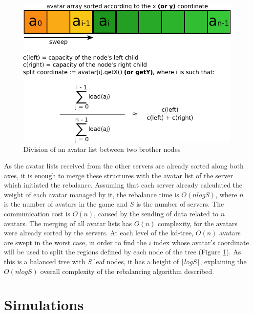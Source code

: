 \documentclass[acmjacm]{acmtrans2m}
\newcommand{\figurecaption}{Figure}
\begin{document}
\begin{figure}
  \centering
  \includegraphics[width=0.8\linewidth]{images/balancenode}
  \caption{Division of an avatar list between two brother nodes}
   \label{fig:balancenode}
\end{figure}

As the avatar lists received from the other servers are already sorted along both axes, it is enough to merge these structures with the avatar list of the server which initiated the rebalance. Assuming that each server already calculated the weight of each avatar managed by it, the rebalance time is  $O(nlogS)$, where $n$ is the number of avatars in the game and $S$ is the number of servers. The communication cost is $O(n)$, caused by the sending of data related to $n$ avatars. The merging of all avatar lists has $O(n)$ complexity, for the avatars were already sorted by the servers. At each level of the kd-tree, $O(n)$ avatars are swept in the worst case, in order to find the $i$ index whose avatar's coordinate will be used to split the regions defined by each node of the tree (\figurecaption{} \ref{fig:balancenode}). As this is a balanced tree with $S$ leaf nodes, it has a height of $\lceil logS \rceil$, explaining the $O(nlogS)$ overall complexity of the rebalancing algorithm described.

\section{Simulations}
\label{sec:simul}
\end{document}
